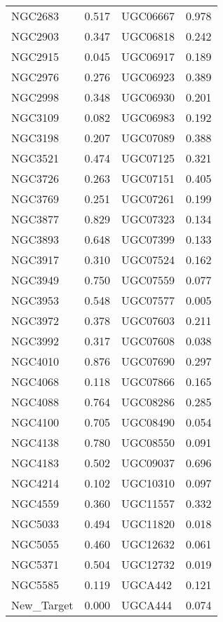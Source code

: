 \begin{tabular}{lrlr}
    NGC2683 &  0.517 &  UGC06667 &  0.978 \\
    NGC2903 &  0.347 &  UGC06818 &  0.242 \\
    NGC2915 &  0.045 &  UGC06917 &  0.189 \\
    NGC2976 &  0.276 &  UGC06923 &  0.389 \\
    NGC2998 &  0.348 &  UGC06930 &  0.201 \\
    NGC3109 &  0.082 &  UGC06983 &  0.192 \\
    NGC3198 &  0.207 &  UGC07089 &  0.388 \\
    NGC3521 &  0.474 &  UGC07125 &  0.321 \\
    NGC3726 &  0.263 &  UGC07151 &  0.405 \\
    NGC3769 &  0.251 &  UGC07261 &  0.199 \\
    NGC3877 &  0.829 &  UGC07323 &  0.134 \\
    NGC3893 &  0.648 &  UGC07399 &  0.133 \\
    NGC3917 &  0.310 &  UGC07524 &  0.162 \\
    NGC3949 &  0.750 &  UGC07559 &  0.077 \\
    NGC3953 &  0.548 &  UGC07577 &  0.005 \\
    NGC3972 &  0.378 &  UGC07603 &  0.211 \\
    NGC3992 &  0.317 &  UGC07608 &  0.038 \\
    NGC4010 &  0.876 &  UGC07690 &  0.297 \\
    NGC4068 &  0.118 &  UGC07866 &  0.165 \\
    NGC4088 &  0.764 &  UGC08286 &  0.285 \\
    NGC4100 &  0.705 &  UGC08490 &  0.054 \\
    NGC4138 &  0.780 &  UGC08550 &  0.091 \\
    NGC4183 &  0.502 &  UGC09037 &  0.696 \\
    NGC4214 &  0.102 &  UGC10310 &  0.097 \\
    NGC4559 &  0.360 &  UGC11557 &  0.332 \\
    NGC5033 &  0.494 &  UGC11820 &  0.018 \\
    NGC5055 &  0.460 &  UGC12632 &  0.061 \\
    NGC5371 &  0.504 &  UGC12732 &  0.019 \\
    NGC5585 &  0.119 &   UGCA442 &  0.121 \\
 New_Target &  0.000 &   UGCA444 &  0.074 \\
\bottomrule
\end{tabular}
